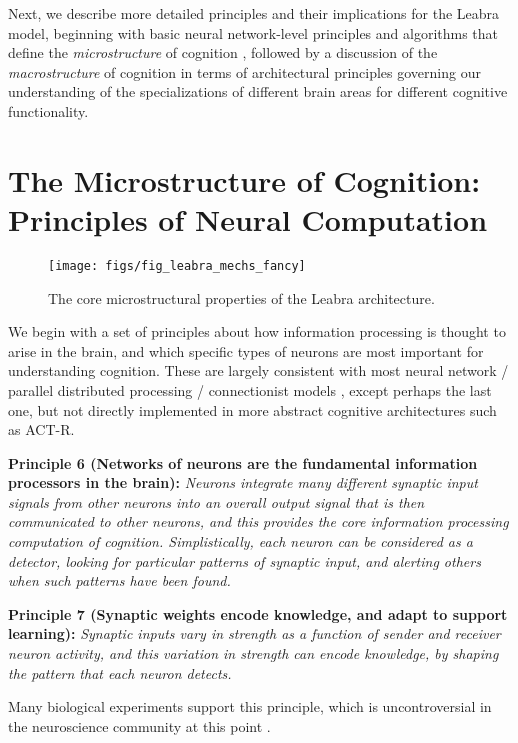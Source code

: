 \documentclass[11pt,twoside]{article}
\begin{document}
Next, we describe more detailed principles and their implications for the Leabra model, beginning with basic neural network-level principles and algorithms that define the {\em microstructure} of cognition \cite[c.f.,]{RumelhartMcClelland86,McClellandRumelhart86}, followed by a discussion of the {\em macrostructure} of cognition in terms of architectural principles governing our understanding of the specializations of different brain areas for different cognitive functionality.

\section{The Microstructure of Cognition: Principles of Neural Computation}

\begin{figure}
  \centering\texttt{[image: figs/fig\_leabra\_mechs\_fancy]}
  \caption{\small The core microstructural properties of the Leabra architecture.}
  \label{fig.leabra_mechs}
\end{figure}

We begin with a set of principles about how information processing is thought to arise in the brain, and which specific types of neurons are most important for understanding cognition.  These are largely consistent with most neural network / parallel distributed processing / connectionist models \cite{PDPrefs,JayGRAIN,etc}, except perhaps the last one, but not directly implemented in more abstract cognitive architectures such as ACT-R.

{\bf Principle 6 (Networks of neurons are the fundamental information processors in the brain):} {\em Neurons integrate many different synaptic input signals from other neurons into an overall output signal that is then communicated to other neurons, and this provides the core information processing computation of cognition.  Simplistically, each neuron can be considered as a detector, looking for particular patterns of synaptic input, and alerting others when such patterns have been found.}

{\bf Principle 7 (Synaptic weights encode knowledge, and adapt to support learning):} {\em Synaptic inputs vary in strength as a function of sender and receiver neuron activity, and this variation in strength can encode knowledge, by shaping the pattern that each neuron detects.}

Many biological experiments support this principle, which is uncontroversial in the neuroscience community at this point \cite{ltpsynapserefs}.
\end{document}
